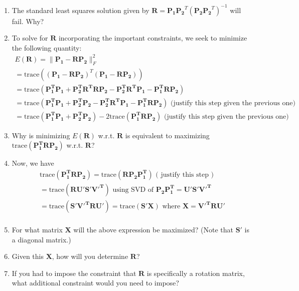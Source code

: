 \documentclass[11pt]{article}
\begin{document}
\begin{enumerate}
\begin{enumerate}
\item The standard least squares solution given by $\boldsymbol{R} = \boldsymbol{P_1} \boldsymbol{P_2}^T  (\boldsymbol{P_2} \boldsymbol{P_2}^T)^{-1}$ will fail. Why? 
\item To solve for $\boldsymbol{R}$ incorporating the important constraints, we seek to minimize the following quantity:
\begin{eqnarray}
E(\boldsymbol{R}) = \|\boldsymbol{P_1} - \boldsymbol{R} \boldsymbol{P_2}\|^2_F \\
= \textrm{trace}((\boldsymbol{P_1} -\boldsymbol{R} \boldsymbol{P_2})^T(\boldsymbol{P_1} - \boldsymbol{R} \boldsymbol{P_2})) \\
= \textrm{trace}(\boldsymbol{P^T_1 P_1} + \boldsymbol{P^T_2 R^T R P_2} - \boldsymbol{P^T_2 R^T P_1} - \boldsymbol{P^T_1 R P_2}) \\
= \textrm{trace}(\boldsymbol{P^T_1 P_1} + \boldsymbol{P^T_2 P_2} - \boldsymbol{P^T_2 R^T P_1} - \boldsymbol{P^T_1 R P_2})  \textrm{ (justify this step given the previous one) } \\
= \textrm{trace}(\boldsymbol{P^T_1 P_1} + \boldsymbol{P^T_2 P_2}) -2\textrm{trace}(\boldsymbol{P^T_1 R P_2}) \textrm{ (justify this step given the previous one) } 
\end{eqnarray}

\item Why is minimizing $E(\boldsymbol{R})$ w.r.t. $\boldsymbol{R}$ is equivalent to maximizing $\textrm{trace}(\boldsymbol{P^T_1 R P_2})$ w.r.t. $\boldsymbol{R}$?

\item Now, we have
\begin{eqnarray}
\textrm{trace}(\boldsymbol{P^T_1 R P_2}) = \textrm{trace}(\boldsymbol{R P_2 P^T_1})  \textrm{ ( justify this step ) } \\ 
= \textrm{trace}(\boldsymbol{R U'S'V'^T}) \textrm{ using SVD of } \boldsymbol{P_2 P^T_1 = U'S'V'^T} \\
= \textrm{trace}(\boldsymbol{S' V'^TR U'}) = \textrm{trace}(\boldsymbol{S' X}) \textrm{ where } \boldsymbol{X} = \boldsymbol{V'^TR U'} \\
\end{eqnarray}

\item For what matrix $\boldsymbol{X}$ will the above expression be maximized? (Note that $\boldsymbol{S'}$ is a diagonal matrix.)
\item Given this $\boldsymbol{X}$, how will you determine $\boldsymbol{R}$? 
\item If you had to impose the constraint that $\boldsymbol{R}$ is specifically a rotation matrix, what additional constraint would you need to impose? 
\end{enumerate}


\end{enumerate}
\end{document}
